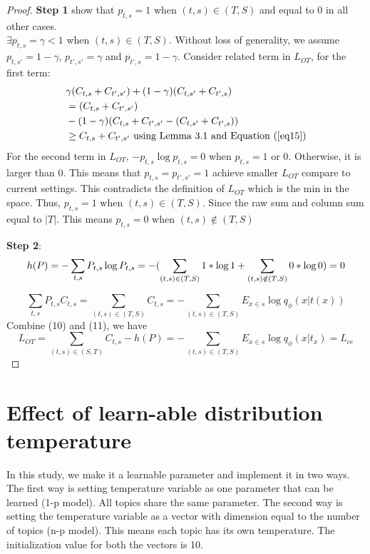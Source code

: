 \documentclass[11pt]{article}
\begin{document}
\begin{proof}
\textbf{Step 1} show that $p_{t, s} = 1$ when $(t, s) \in (T, S)$ and equal to 0 in all other cases.\\ 
$\exists p_{t, s} = \gamma < 1$ when $(t, s) \in (T, S)$. Without loss of generality, we assume  $p_{t, s'} = 1 - \gamma$, $p_{t', s'} = \gamma$ and $p_{t', s} = 1 - \gamma$. Consider related term in $L_{OT}$, for the first term: 
\begin{align*}
&\gamma (C_{t,s} + C_{t', s'}) + (1 - \gamma) (C_{t,s'} + C_{t', s}) \\
&= (C_{t,s} + C_{t', s'}) \\
&- (1 - \gamma) (C_{t,s} + C_{t', s'} - (C_{t,s'} + C_{t', s})) \\
&\geq C_{t,s} + C_{t', s'} \text{ using Lemma 3.1 and Equation (\ref{eq15})}
\end{align*}
  For the second term in $L_{OT}$, $-p_{t, s} \log p_{t, s}= 0$ when $p_{t, s} = 1$ or 0. Otherwise, it is larger than 0. This means that $p_{t, s} = p_{t', s'} = 1$ achieve smaller $L_{OT}$ compare to current settings. This contradicts the definition of $L_{OT}$ which is the min in the space.  Thus, $p_{t, s} = 1$ when $(t, s) \in (T, S)$. Since the raw sum and column sum equal to $|T|$. This means $p_{t, s} = 0$ when $(t, s) \notin (T, S)$


\textbf{Step 2}: 
\begin{dmath}h(P) = - \sum_{t,s} P_{t,s} \log P_{t,s} \\
 = - (\sum_{(t, s) \in (T,S)} 1 * \log 1 + \sum_{(t, s) \notin (T,S)} 0 * \log 0)  = 0 \end{dmath}
 
 
\begin{dmath}\sum_{t,s} P_{t,s} C_{t, s} = \sum_{(t, s) \in (T, S)} C_{t, s} 
=- \sum_{(t, s) \in (T, S)} E_{x\in s} \log q_{\phi}(x|t(x)) \end{dmath}
Combine (10) and (11), we have \begin{dmath}L_{OT} = \sum_{(t,s)\in(S, T)}  C_{t, s} - h(P)= - \sum_{(t,s) \in (T, S)} E_{x \in s} \log q_{\phi}(x|t_{x})  
= L_{ce} \end{dmath}

\end{proof}


\section{Effect of learn-able distribution temperature}
\label{appendix:temperature}
In this study, we make it a learnable parameter and implement it in two ways. The first way is setting temperature variable as one parameter that can be learned (1-p model). All topics share the same parameter. The second way is setting the temperature variable as a vector with dimension equal to the number of topics (n-p model). This means each topic has its own temperature. The initialization value for both the vectors is 10.
\end{document}
